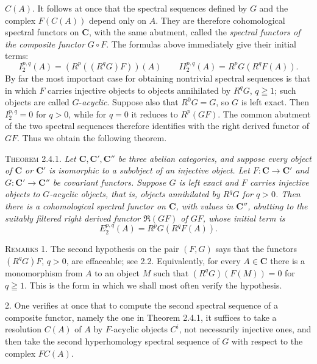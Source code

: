 
\noindent $C(A)$. It follows at once that the spectral sequences defined by
$G$ and the complex $F(C(A))$ depend only on $A$. They are therefore
cohomological spectral functors on $\mathbf{C}$, with the same abutment, called the
\textit{spectral functors of the composite functor} $G\mathbin{\circ}F$. The
formulas above immediately give their initial terms:
\[
I_2^{p,q}(A)=(R^p((R^qG)F))(A)
\qquad
II_2^{p,q}(A)=R^pG(R^qF(A)).
\]
By far the most important case for obtaining nontrivial spectral sequences is
that in which $F$ carries injective objects to objects annihilated by
$R^qG$, $q\geqq1$; such objects are called $G$-\textit{acyclic}. Suppose also that
$R^0G=G$, so $G$ is left exact. Then
$I_2^{p,q}=0$ for $q>0$, while for $q=0$ it reduces to
$R^p(GF)$. The common abutment of the two spectral sequences therefore
identifies with the right derived functor of $GF$. Thus we obtain the
following theorem.

\textsc{Theorem 2.4.1.} \textit{Let $\mathbf{C},\mathbf{C}',\mathbf{C}''$ be three abelian
categories, and suppose every object of $\mathbf{C}$ or $\mathbf{C}'$ is isomorphic to a
subobject of an injective object. Let $F:\mathbf{C}\to \mathbf{C}'$ and
$G:\mathbf{C}'\to \mathbf{C}''$ be covariant functors. Suppose $G$ is left exact
and $F$ carries injective objects to $G$-acyclic objects, that is, objects
annihilated by $R^qG$ for $q>0$. Then there is a cohomological spectral
functor on $\mathbf{C}$, with values in $\mathbf{C}''$, abutting to the suitably filtered right
derived functor $\mathfrak R(GF)$ of $GF$, whose initial term is}
\[
\tag{2.4.3}
E_2^{p,q}(A)=R^pG(R^qF(A)).
\]

\textsc{Remarks 1.} The second hypothesis on the pair $(F,G)$ says
that the functors $(R^qG)F$, $q>0$, are effaceable; see 2.2. Equivalently,
for every $A\in \mathbf{C}$ there is a monomorphism from $A$ to an object $M$ such that
$(R^qG)(F(M))=0$ for $q\geqq1$. This is the form in which we shall most often
verify the hypothesis.

2. One verifies at once that to compute the second spectral sequence of a composite functor,
namely the one in Theorem 2.4.1, it suffices to take a resolution $C(A)$ of
$A$ by $F$-acyclic objects $C^i$, not necessarily injective ones, and then
take the second hyperhomology spectral sequence of $G$ with respect to the
complex $FC(A)$.

